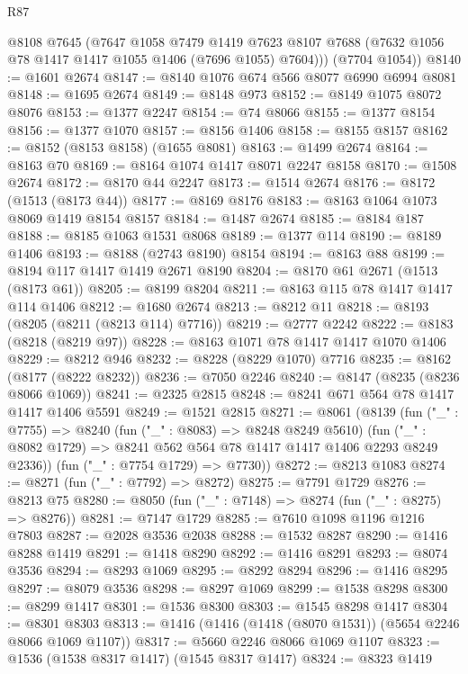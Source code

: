 \begin{lexlean}{R87}
\begin{coremodule}
{{        @8108
        @7645
        (@7647
          @1058
          @7479
          @1419
          @7623
          @8107
          @7688
          (@7632 @1056 @78 @1417 @1417 @1055 @1406 (@7696 @1055) @7604)))
      (@7704 @1054))
@8140 := @1601 @2674
@8147 := @8140 @1076 @674 @566 @8077 @6990 @6994 @8081
@8148 := @1695 @2674
@8149 := @8148 @973
@8152 := @8149 @1075 @8072 @8076
@8153 := @1377 @2247
@8154 := @74 @8066
@8155 := @1377 @8154
@8156 := @1377 @1070
@8157 := @8156 @1406
@8158 := @8155 @8157
@8162 := @8152 (@8153 @8158) (@1655 @8081)
@8163 := @1499 @2674
@8164 := @8163 @70
@8169 := @8164 @1074 @1417 @8071 @2247 @8158
@8170 := @1508 @2674
@8172 := @8170 @44 @2247
@8173 := @1514 @2674
@8176 := @8172 (@1513 (@8173 @44))
@8177 := @8169 @8176
@8183 := @8163 @1064 @1073 @8069 @1419 @8154 @8157
@8184 := @1487 @2674
@8185 := @8184 @187
@8188 := @8185 @1063 @1531 @8068
@8189 := @1377 @114
@8190 := @8189 @1406
@8193 := @8188 (@2743 @8190) @8154
@8194 := @8163 @88
@8199 := @8194 @117 @1417 @1419 @2671 @8190
@8204 := @8170 @61 @2671 (@1513 (@8173 @61))
@8205 := @8199 @8204
@8211 := @8163 @115 @78 @1417 @1417 @114 @1406
@8212 := @1680 @2674
@8213 := @8212 @11
@8218 := @8193 (@8205 (@8211 (@8213 @114) @7716))
@8219 := @2777 @2242
@8222 := @8183 (@8218 (@8219 @97))
@8228 := @8163 @1071 @78 @1417 @1417 @1070 @1406
@8229 := @8212 @946
@8232 := @8228 (@8229 @1070) @7716
@8235 := @8162 (@8177 (@8222 @8232))
@8236 := @7050 @2246
@8240 := @8147 (@8235 (@8236 @8066 @1069))
@8241 := @2325 @2815
@8248 := @8241 @671 @564 @78 @1417 @1417 @1406 @5591
@8249 := @1521 @2815
@8271 := @8061
    (@8139
      (fun ("_" : @7755) =>
      @8240
        (fun ("_" : @8083) => @8248 @8249 @5610)
        (fun ("_" : @8082 @1729) => @8241 @562 @564 @78 @1417 @1417 @1406 @2293 @8249 @2336))
      (fun ("_" : @7754 @1729) => @7730))
@8272 := @8213 @1083
@8274 := @8271 (fun ("_" : @7792) => @8272)
@8275 := @7791 @1729
@8276 := @8213 @75
@8280 := @8050 (fun ("_" : @7148) => @8274 (fun ("_" : @8275) => @8276))
@8281 := @7147 @1729
@8285 := @7610 @1098 @1196 @1216 @7803
@8287 := @2028 @3536 @2038
@8288 := @1532 @8287
@8290 := @1416 @8288 @1419
@8291 := @1418 @8290
@8292 := @1416 @8291
@8293 := @8074 @3536
@8294 := @8293 @1069
@8295 := @8292 @8294
@8296 := @1416 @8295
@8297 := @8079 @3536
@8298 := @8297 @1069
@8299 := @1538 @8298
@8300 := @8299 @1417
@8301 := @1536 @8300
@8303 := @1545 @8298 @1417
@8304 := @8301 @8303
@8313 := @1416 (@1416 (@1418 (@8070 @1531)) (@5654 @2246 @8066 @1069 @1107))
@8317 := @5660 @2246 @8066 @1069 @1107
@8323 := @1536 (@1538 @8317 @1417) (@1545 @8317 @1417)
@8324 := @8323 @1419
}}
\end{coremodule}
\end{lexlean}
